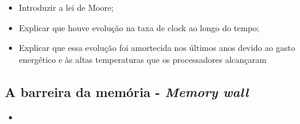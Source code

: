         \begin{itemize}
            \item Introduzir a lei de Moore;
            \item Explicar que houve evolução na taxa de clock ao longo do tempo;
            \item Explicar que essa evolução foi amortecida nos últimos anos devido 
            ao gasto energético e às altas temperaturas que os processadores alcançaram 
        \end{itemize}
    
    \subsection{A barreira da memória - \textit{Memory wall}}
    
	    
	    \begin{itemize}
	    	\item 
	    \end{itemize}